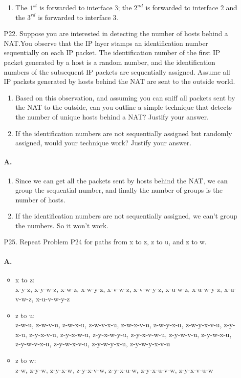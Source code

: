 \documentclass[]{article}
\begin{document}
\begin{enumerate}
\begin{enumerate}
			\item
			The $1^{st}$ is forwarded to interface 3; the $2^{nd}$ is forwarded to interface 2 and the $3^{rd}$ is forwarded to interface 3.
		\end{enumerate}	
	
		\item[P22.] Suppose you are interested in detecting the number of hosts behind a NAT.You observe that the IP layer stamps an identification number sequentially on each IP packet. The identification number of the first IP packet generated by a host is a random number, and the identification numbers of the subsequent IP packets are sequentially assigned. Assume all IP packets generated by hosts behind the NAT are sent to the outside world.
		\begin{enumerate}
			\item Based on this observation, and assuming you can sniff all packets sent by the NAT to the outside, can you outline a simple technique that detects the number of unique hosts behind a NAT? Justify your answer.
			\item If the identification numbers are not sequentially assigned but randomly assigned, would your technique work? Justify your answer.
		\end{enumerate}
		\paragraph{A.}
		\begin{enumerate}
			\item Since we can get all the packets sent by hosts behind the NAT, we can group the sequential number, and finally the number of groups is the number of hosts.
			\item If the identification numbers are not sequentially assigned, we can't group the numbers. So it won't work.
		\end{enumerate}
		
		\item[P25.] Repeat Problem P24 for paths from x to z, z to u, and z to w.
		\begin{figure}[H]
			\centering
			
			\caption{}
			\label{fig:4}
		\end{figure}
		\paragraph{A.}
		\begin{itemize}
			\item x to z:\\
			x-y-z, x-y-w-z, x-w-z, x-w-y-z,	x-v-w-z, x-v-w-y-z, x-u-w-z, x-u-w-y-z, x-u-v-w-z, x-u-v-w-y-z
			\item z to u:\\
			z-w-u, z-w-v-u, z-w-x-u, z-w-v-x-u, z-w-x-v-u, z-w-y-x-u, z-w-y-x-v-u, z-y-x-u, z-y-x-v-u, z-y-x-w-u, z-y-x-w-y-u, z-y-x-v-w-u, z-y-w-v-u, z-y-w-x-u, z-y-w-v-x-u, z-y-w-x-v-u, z-y-w-y-x-u, z-y-w-y-x-v-u
			\item z to w:\\
			z-w, z-y-w, z-y-x-w, z-y-x-v-w, z-y-x-u-w, z-y-x-u-v-w, z-y-x-v-u-w
		\end{itemize}
		

\end{enumerate}
\end{document}
